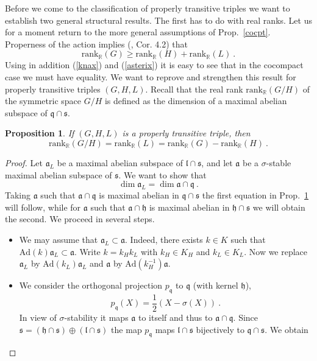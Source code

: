 \documentclass[10]{amsart}
\newtheorem{pro}[thm]{Proposition}
\theoremstyle{remark}
\theoremstyle{definition}
\numberwithin{equation}{section}
\newcommand{\Rrank}{\text{rank}_{\mathbb{R}}}
\newcommand{\rank}{\text{rank}}
\newcommand{\Ad}{\text{Ad}}
\newcommand{\fa}{{\mathfrak a}}             %
\newcommand{\fh}{{\mathfrak h}}
\newcommand{\fl}{{\mathfrak l}}
\newcommand{\fq}{{\mathfrak q}}
\newcommand{\fs}{{\mathfrak s}}
\newcommand{\be}{\begin{equation}}
\begin{document}
{Before we come to the classification of properly transitive triples we want  to establish two general structural results.
The first has to do with real ranks.
Let us for a moment return to the more general assumptions of Prop.~\ref{cocpt}. Properness of the action implies (\cite{Kos89}, Cor. 4.2) that 
$$\Rrank(G)\ge\Rrank(H)+\Rrank(L)\ .$$
Using in addition (\ref{knax}) and (\ref{asterix}) it is easy to see that in the cocompact case we must have equality.
We want to reprove and strengthen this result for properly transitive triples $(G,H,L)$. 
Recall that the real rank $\Rrank(G/H)$ of the symmetric space $G/H$ is defined as the dimension of a maximal abelian subspace of $\fq\cap\fs$. 
%
\begin{pro}\label{ranksymm}
If $(G,H,L)$ is a properly transitive triple, then $$\rank_{\mathbb {R}} (G/H)=\rank_{\mathbb {R}} (L)=\Rrank(G)-\Rrank(H)\ .$$
\end{pro}
%
\begin{proof}
Let $\fa_L$ be a maximal abelian subspace of $\fl\cap\fs$, and let
$\fa$ be a $\sigma$-stable maximal abelian subspace of $\fs$. We want to show that
\be\label{murphy}
\dim \fa_L=\dim \fa\cap\fq\ .
\end{equation}
Taking $\fa$ such that $\fa\cap\fq$ is maximal abelian in $\fq\cap\fs$ the first equation in Prop.~\ref{ranksymm} will follow, while for $\fa$ such that $\fa\cap\fh$ is maximal abelian in $\fh\cap\fs$ we will obtain the second. We proceed in several steps.
\begin{itemize}
\item[(i)]  We may assume that $\fa_L\subset\fa$. Indeed, there exists $k\in K$ such that $\Ad(k){\fa_L}\subset\fa$. Write $k=k_Hk_L$ with $k_H\in K_H$ and $k_L\in K_L$. Now we replace $\fa_L$ by $\Ad(k_L)\fa_L$ and $\fa$ by $\Ad(k_H^{-1})\fa$.
\item[(ii)] We consider the orthogonal projection $p_\fq$ to $\fq$ (with kernel $\fh$), 
\be\label{hermann}
p_\fq(X)=\frac{1}{2}(X-\sigma(X))\ .
\end{equation} 
In view of $\sigma$-stability it maps $\fa$ to itself and thus to $\fa\cap \fq$.
Since $\fs=(\fh\cap\fs)\oplus(\fl\cap\fs)$ the map $p_\fq$ maps $\fl\cap\fs$ bijectively to $\fq\cap\fs$. We obtain

\end{itemize}
\end{proof}}
\end{document}
